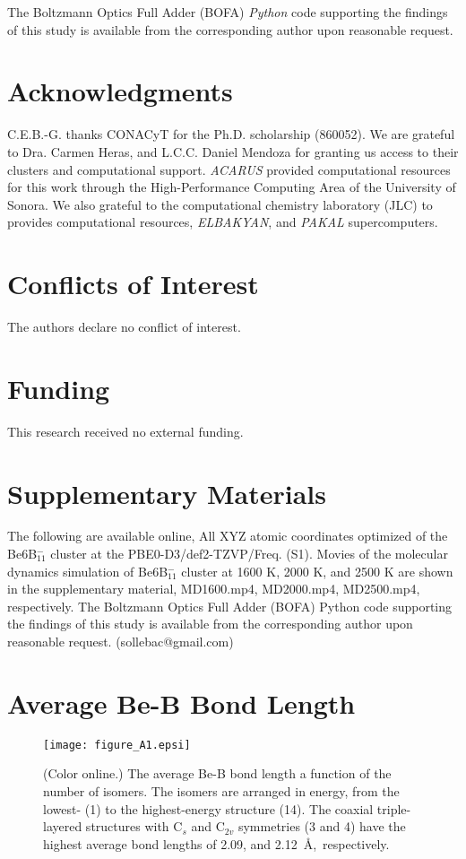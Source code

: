 \documentclass[prb,aps,preprint,showkeys,showpacs]{revtex4}
\begin{document}
The Boltzmann Optics Full Adder (BOFA) \emph{Python} code supporting the findings of this study is available from the corresponding author upon reasonable request.


\section{Acknowledgments}
C.E.B.-G. thanks CONACyT for the Ph.D. scholarship (860052). We are grateful to Dra. Carmen Heras, and L.C.C. Daniel Mendoza for granting us access to their clusters and computational support. \emph{ACARUS} provided computational resources for this work through the High-Performance Computing Area of the University of Sonora. We also grateful to the computational chemistry laboratory (JLC) to provides computational resources, \emph{ELBAKYAN}, and \emph{PAKAL} supercomputers.
\section{Conflicts of Interest} The authors declare no conflict of interest.
\section{Funding} This research received no external funding.

\section{Supplementary Materials}
The following are available online, All XYZ atomic coordinates optimized of the Be$6$B$_{11}^{-}$ cluster at the PBE0-D3/def2-TZVP/Freq. (S1). Movies of the molecular dynamics simulation of Be$6$B$_{11}^{-}$ cluster at 1600 K, 2000 K, and 2500 K are shown in the supplementary material, MD1600.mp4, MD2000.mp4, MD2500.mp4, respectively. The Boltzmann Optics Full Adder (BOFA) Python code supporting the findings of this study is available from the corresponding author upon reasonable request. (sollebac@gmail.com)

\newpage 
\appendix
\section{Average Be-B Bond Length}
\label{appendix:a}
\begin{figure}[ht]
  \begin{center}
  \texttt{[image: figure\_A1.epsi]} 
  \caption{(Color online.)  The average Be-B bond length a function of the number of isomers. The isomers are arranged in energy, from the lowest- (1) to the highest-energy structure (14). The coaxial triple-layered structures with C$_s$ and C$_{2v}$ symmetries (3 and 4) have the highest average bond lengths of 2.09, and 2.12~\AA,~respectively.}
  \label{cubic}
  \end{center}
\end{figure}
\newpage 
\end{document}
